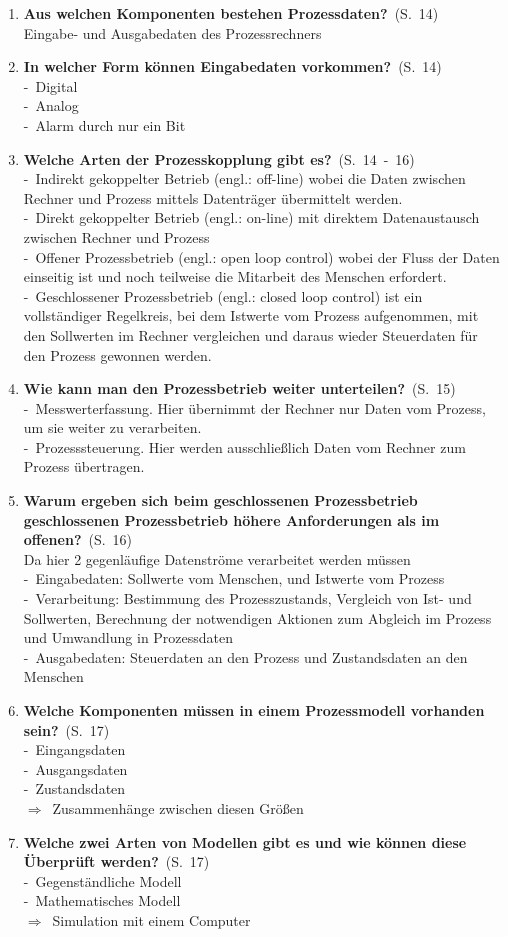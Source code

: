 \documentclass[a4paper,12pt]{article}
\newcommand{\question}[3]{\pagebreak[3]\item {\textbf{#1?}}\ (S.\ #2)#3}
\newcommand{\catchword}[1]{\\-\ #1}
\newcommand{\normaltext}[1]{\\#1}
\newcommand{\result}[1]{\\$\Rightarrow$\ #1}
\newcommand{\page}[1]{#1}
\newcommand{\pages}[2]{#1\ -\ #2}
\begin{document}
\begin{enumerate}
  \question{Aus welchen Komponenten bestehen Prozessdaten}{\page{14}}
  {
    \normaltext{Eingabe- und Ausgabedaten des Prozessrechners}
  }

  \question{In welcher Form können Eingabedaten vorkommen}{\page{14}}
  {
    \catchword{Digital}
    \catchword{Analog}
    \catchword{Alarm durch nur ein Bit}
  }

  \question{Welche Arten der Prozesskopplung gibt es}{\pages{14}{16}}
  {
    \catchword{Indirekt gekoppelter Betrieb (engl.: off-line) wobei die Daten zwischen Rechner und Prozess
    mittels Datenträger übermittelt werden.}
    \catchword{Direkt gekoppelter Betrieb (engl.: on-line) mit direktem Datenaustausch
               zwischen Rechner und Prozess}
    \catchword{Offener Prozessbetrieb (engl.: open loop control) wobei der Fluss der Daten
               einseitig ist und noch teilweise die Mitarbeit des Menschen erfordert.}
    \catchword{Geschlossener Prozessbetrieb (engl.: closed loop control) ist ein vollständiger
               Regelkreis, bei dem Istwerte vom Prozess aufgenommen, mit den Sollwerten im
               Rechner vergleichen und daraus wieder Steuerdaten für den Prozess gewonnen werden.}
  }

  \question{Wie kann man den Prozessbetrieb weiter unterteilen}{\page{15}}
  {
    \catchword{Messwerterfassung. Hier übernimmt der Rechner nur Daten vom Prozess,
               um sie weiter zu verarbeiten.}
    \catchword{Prozesssteuerung. Hier werden ausschließlich Daten vom Rechner zum Prozess übertragen. }
  }

  \question{Warum ergeben sich beim geschlossenen Prozessbetrieb geschlossenen Prozessbetrieb
            höhere Anforderungen als im offenen}{\page{16}}
  {
    \normaltext{Da hier 2 gegenläufige Datenströme verarbeitet werden müssen}
    \catchword{Eingabedaten: Sollwerte vom Menschen, und Istwerte vom Prozess}
    \catchword{Verarbeitung: Bestimmung des Prozesszustands, Vergleich von Ist- und Sollwerten,
               Berechnung der notwendigen Aktionen zum Abgleich im Prozess und Umwandlung in Prozessdaten}
    \catchword{Ausgabedaten: Steuerdaten an den Prozess und Zustandsdaten an den Menschen}
  }

  \question{Welche Komponenten müssen in einem Prozessmodell vorhanden sein}{\page{17}}
  {
    \catchword{Eingangsdaten}
    \catchword{Ausgangsdaten}
    \catchword{Zustandsdaten}
    \result{Zusammenhänge zwischen diesen Größen}
  }

  \question{Welche zwei Arten von Modellen gibt es und wie können diese Überprüft werden}{\page{17}}
  {
    \catchword{Gegenständliche Modell}
    \catchword{Mathematisches Modell}
    \result{Simulation mit einem Computer}
  }


\end{enumerate}
\end{document}
